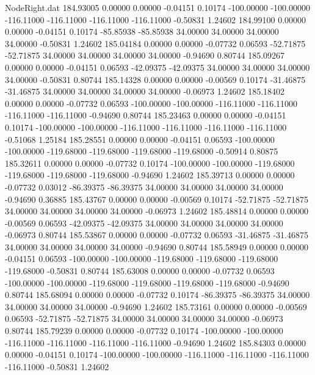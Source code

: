 \begin{filecontents}{NodeRight.dat}
 184.93005    0.00000    0.00000    -0.04151    0.10174 -100.00000 -100.00000 -116.11000 -116.11000 -116.11000 -116.11000   -0.50831    1.24602
 184.99100    0.00000    0.00000    -0.04151    0.10174  -85.85938  -85.85938   34.00000   34.00000   34.00000   34.00000   -0.50831    1.24602
 185.04184    0.00000    0.00000    -0.07732    0.06593  -52.71875  -52.71875   34.00000   34.00000   34.00000   34.00000   -0.94690    0.80744
 185.09267    0.00000    0.00000    -0.04151    0.06593  -42.09375  -42.09375   34.00000   34.00000   34.00000   34.00000   -0.50831    0.80744
 185.14328    0.00000    0.00000    -0.00569    0.10174  -31.46875  -31.46875   34.00000   34.00000   34.00000   34.00000   -0.06973    1.24602
 185.18402    0.00000    0.00000    -0.07732    0.06593 -100.00000 -100.00000 -116.11000 -116.11000 -116.11000 -116.11000   -0.94690    0.80744
 185.23463    0.00000    0.00000    -0.04151    0.10174 -100.00000 -100.00000 -116.11000 -116.11000 -116.11000 -116.11000   -0.51068    1.25184
 185.28551    0.00000    0.00000    -0.04151    0.06593 -100.00000 -100.00000 -119.68000 -119.68000 -119.68000 -119.68000   -0.50914    0.80875
 185.32611    0.00000    0.00000    -0.07732    0.10174 -100.00000 -100.00000 -119.68000 -119.68000 -119.68000 -119.68000   -0.94690    1.24602
 185.39713    0.00000    0.00000    -0.07732    0.03012  -86.39375  -86.39375   34.00000   34.00000   34.00000   34.00000   -0.94690    0.36885
 185.43767    0.00000    0.00000    -0.00569    0.10174  -52.71875  -52.71875   34.00000   34.00000   34.00000   34.00000   -0.06973    1.24602
 185.48814    0.00000    0.00000    -0.00569    0.06593  -42.09375  -42.09375   34.00000   34.00000   34.00000   34.00000   -0.06973    0.80744
 185.53867    0.00000    0.00000    -0.07732    0.06593  -31.46875  -31.46875   34.00000   34.00000   34.00000   34.00000   -0.94690    0.80744
 185.58949    0.00000    0.00000    -0.04151    0.06593 -100.00000 -100.00000 -119.68000 -119.68000 -119.68000 -119.68000   -0.50831    0.80744
 185.63008    0.00000    0.00000    -0.07732    0.06593 -100.00000 -100.00000 -119.68000 -119.68000 -119.68000 -119.68000   -0.94690    0.80744
 185.68094    0.00000    0.00000    -0.07732    0.10174  -86.39375  -86.39375   34.00000   34.00000   34.00000   34.00000   -0.94690    1.24602
 185.73161    0.00000    0.00000    -0.00569    0.06593  -52.71875  -52.71875   34.00000   34.00000   34.00000   34.00000   -0.06973    0.80744
 185.79239    0.00000    0.00000    -0.07732    0.10174 -100.00000 -100.00000 -116.11000 -116.11000 -116.11000 -116.11000   -0.94690    1.24602
 185.84303    0.00000    0.00000    -0.04151    0.10174 -100.00000 -100.00000 -116.11000 -116.11000 -116.11000 -116.11000   -0.50831    1.24602

\end{filecontents}
